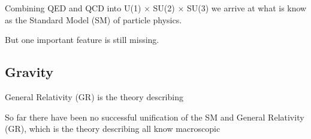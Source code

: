 Combining QED and QCD into U(1) $\times$ SU(2) $\times$ SU(3) we arrive at what is know as the Standard Model (SM) of particle physics.

But one important feature is still missing.

\subsection{Gravity}
General Relativity (GR) is the theory describing


So far there have been no successful unification of the SM and General Relativity (GR), which is the theory describing all know macroscopic